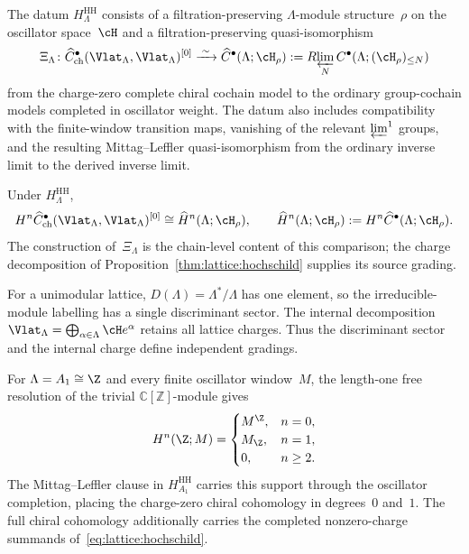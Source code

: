 \begin{definition}
\label{def:lattice-hochschild-comparison-package}
The datum $H_{\Lambda}^{\mathrm{HH}}$ consists of a
filtration-preserving $\Lambda$-module structure~$\rho$ on the
oscillator space~$\cH$ and a filtration-preserving quasi-isomorphism
\[
 \Xi_\Lambda\colon
 \widehat C^\bullet_{\mathrm{ch}}
 (\Vlat_\Lambda,\Vlat_\Lambda)^{[0]}
 \xrightarrow{\;\sim\;}
 \widehat C^\bullet(\Lambda;\cH_\rho)
 :=R\!\varprojlim_N C^\bullet(\Lambda;(\cH_\rho)_{\leq N})
\]
from the charge-zero complete chiral cochain model to the ordinary
group-cochain models completed in oscillator weight.  The datum also
includes compatibility with the finite-window transition maps,
vanishing of the relevant $\varprojlim^1$ groups, and the resulting
Mittag--Leffler quasi-isomorphism from the ordinary inverse limit to the
derived inverse limit.
\end{definition}

\begin{proposition}\label{prop:lattice-hochschild-group-comparison}
Under $H_{\Lambda}^{\mathrm{HH}}$,
\[
H^n \widehat C^\bullet_{\mathrm{ch}}
(\Vlat_\Lambda,\Vlat_\Lambda)^{[0]}
\cong \widehat H^n(\Lambda;\cH_\rho),
\qquad
\widehat H^n(\Lambda;\cH_\rho)
:=H^n\widehat C^\bullet(\Lambda;\cH_\rho).
\]
The construction of~$\Xi_\Lambda$ is the chain-level content of this
comparison; the charge decomposition of
Proposition~\ref{thm:lattice:hochschild} supplies its source grading.
\end{proposition}

\begin{remark}
\label{cor:lattice:hochschild-unimodular}
\label{rem:lattice-unimodularity-charge}
For a unimodular lattice, $D(\Lambda)=\Lambda^*/\Lambda$ has one
element, so the irreducible-module labelling has a single
discriminant sector.  The internal decomposition
$\Vlat_\Lambda=\bigoplus_{\alpha\in\Lambda}\cH e^\alpha$ retains all
lattice charges.  Thus the discriminant sector and the internal charge
define independent gradings.
\end{remark}

\begin{example}
\label{ex:lattice:hochschild-A1}
For $\Lambda=A_1\cong\Z$ and every finite oscillator window~$M$, the
length-one free resolution of the trivial $\mathbb C[\mathbb Z]$-module
gives
\[
H^n(\Z;M)=
\begin{cases}
M^\Z,&n=0,\\
M_\Z,&n=1,\\
0,&n\geq2.
\end{cases}
\]
The Mittag--Leffler clause in $H_{A_1}^{\mathrm{HH}}$ carries this
support through the oscillator completion, placing the charge-zero
chiral cohomology in degrees~$0$ and~$1$.  The full
chiral cohomology additionally carries the completed nonzero-charge
summands of~\eqref{eq:lattice:hochschild}.
\end{example}



